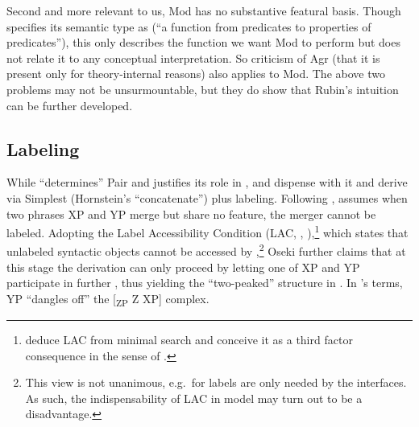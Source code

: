 \documentclass[output=paper]{langsci/langscibook}
\begin{document}
\ea\label{ex:modi}
\z

Second and more relevant to us, Mod has no substantive featural basis. Though
\citet[666]{Rubin2003} specifies its semantic type as
 (``a function from
predicates to properties of predicates''), this only describes the function we
want Mod to perform but does not relate it to any conceptual interpretation. So
 criticism of Agr (that it is present only for
theory-internal reasons) also applies to Mod. The above two problems may not be
unsurmountable, but they do show that Rubin's intuition can be further
developed.


\subsection{Labeling}\label{sec3.2}

While \citet{Rubin2003} ``determines'' Pair  and justifies its role in
, \citet{Hornstein2009} and \citet{Oseki2015} dispense with it and
derive  via Simplest  (Hornstein's ``concatenate'') plus
labeling. %
%
Following \citet{EpsteinEtal2012}, \citet{Oseki2015} assumes when two phrases
XP and YP merge but share no feature, the merger cannot be labeled. Adopting
the Label Accessibility Condition (LAC, \citealt[90]{Hornstein2009},
\citealt[254]{EpsteinEtal2012}),\footnote{\citet[262]{EpsteinEtal2012} deduce
    LAC from minimal search and conceive it as a third factor consequence in
    the sense of \citet{Chomsky2005}.} which states that unlabeled syntactic
    objects cannot be accessed by ,\footnote{This view is not unanimous,
        e.g.\ for \citet{Chomsky2013} labels are only needed by the interfaces.
    As such, the indispensability of LAC in 
model may turn out to be a disadvantage.} Oseki further claims that at this
stage the derivation can only proceed by letting one of XP and YP participate
in further , thus yielding the ``two-peaked'' structure in .
In \citeauthor{Hornstein2009}'s terms, YP ``dangles off'' the
[\textsubscript{ZP} Z XP] complex.
\end{document}
